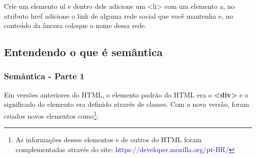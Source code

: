 \documentclass[12pt,a4paper]{article}
\begin{document}
	Crie um elemento ul e dentro dele adicione um <li> com um elemento a, no atributo href adicione o link de alguma rede social que você mantenha e, no conteúdo da âncora coloque o nome dessa rede.
	
	\subsection{Entendendo o que é semântica}
	\subsubsection{Semântica - Parte 1}
	
	Em versões anteriores do HTML, o elemento padrão do HTML era o \textbf{<div>} e o significado do elemento era definido através de classes. Com a nova versão, foram criados novos elementos como\footnote{As informações desses elementos e de outros do HTML foram complementadas através do site: \textcolor{blue}{https://developer.mozilla.org/pt-BR/}}:
	
\end{document}
